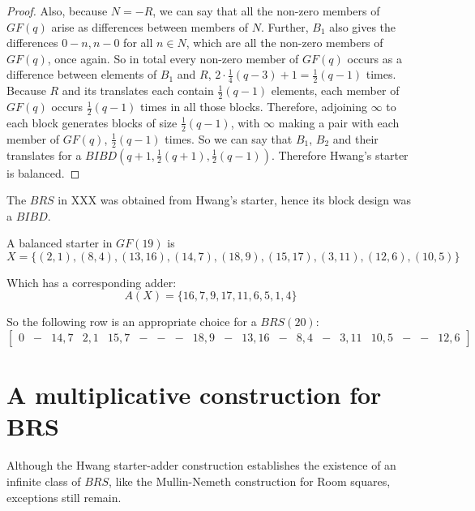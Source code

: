 \documentclass[
  11pt,
  a4paper]{book}
\newcounter{example}
\begin{document}
\begin{proof}
Also, because $N = -R$, we can say that all the non-zero
members of $GF(q)$ arise as differences between members of
$N$. Further, $B_1$ also gives the differences
$0 - n, n - 0$ for all $n\in N$, which are all the non-zero
members
of $GF(q)$, once again. So in total every non-zero member of
$GF(q)$ occurs as a difference between elements of $B_1$ and
$R$, $2 \cdot \frac{1}{4}(q - 3) + 1 = \frac{1}{2} (q - 1)$
times.  Because $R$ and its translates each contain
$\frac{1}{2}(q - 1)$ elements, each member of $GF(q)$ occurs
$\frac{1}{2}(q - 1)$ times in all those blocks. Therefore,
adjoining $\infty$ to each block generates blocks of size
$\frac{1}{2}(q - 1)$, with $\infty$ making a pair with each
member of $GF(q)$, $\frac{1}{2}(q - 1)$ times.  So we can say
that $B_1$, $B_2$ and their translates for a
$BIBD(q  +1, \frac{1}{2}(q + 1), \frac{1}{2}(q - 1))$.
Therefore Hwang’s starter is balanced. 
\end{proof}

The \(BRS\) in XXX was obtained from Hwang's starter, hence its block
design was a \(BIBD\).

\begin{example}
A balanced starter in $GF(19)$ is
\begin{equation}
X = \{(2,1),(8,4),(13,16),(14,7),(18,9),(15,17),(3,11),(12,6),(10,5)\}
\end{equation}

Which has a corresponding adder:
\begin{equation}
A(X) = \{16,7,9,17,11,6,5,1,4\}
\end{equation}

So the following row is an appropriate choice for a
$BRS(20)$:
\begin{equation}
 \begin{bmatrix}
   0 & - & 14,7 & 2,1 & 15,7 & - & - & - & 18,9 & - & 13,16 & - & 8,4 & - & 3,11 & 10,5 & - & - & 12,6
 \end{bmatrix}
\end{equation}

\end{example}

\hypertarget{a-multiplicative-construction-for-brs}{%
\section{A multiplicative construction for
BRS}\label{a-multiplicative-construction-for-brs}}

Although the Hwang starter-adder construction establishes the existence
of an infinite class of \(BRS\), like the Mullin-Nemeth construction for
Room squares, exceptions still remain.
\end{document}
